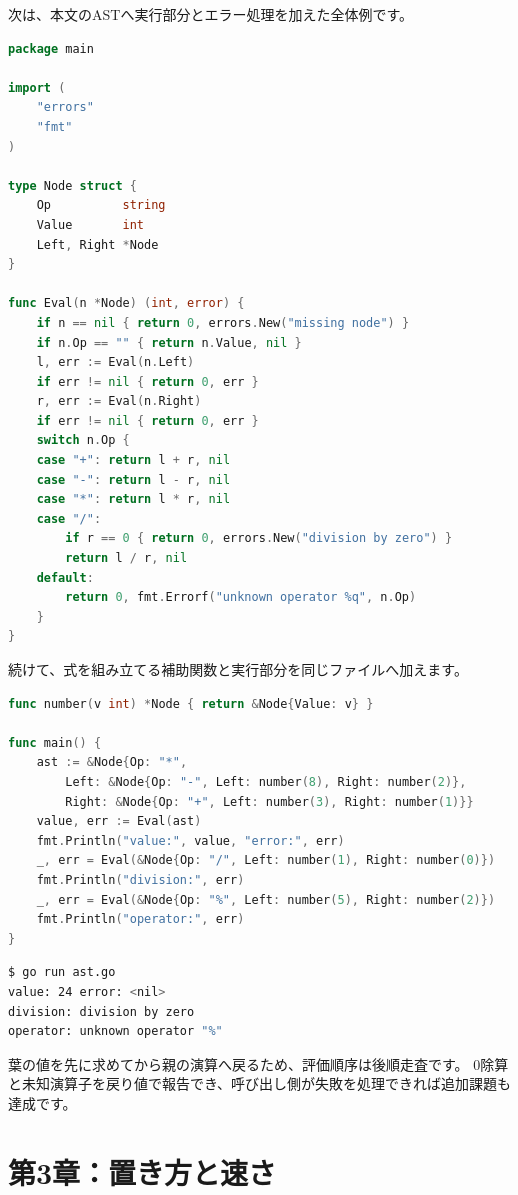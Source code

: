 次は、本文のASTへ実行部分とエラー処理を加えた全体例です。

\begin{lstlisting}[language=Go]
package main

import (
    "errors"
    "fmt"
)

type Node struct {
    Op          string
    Value       int
    Left, Right *Node
}

func Eval(n *Node) (int, error) {
    if n == nil { return 0, errors.New("missing node") }
    if n.Op == "" { return n.Value, nil }
    l, err := Eval(n.Left)
    if err != nil { return 0, err }
    r, err := Eval(n.Right)
    if err != nil { return 0, err }
    switch n.Op {
    case "+": return l + r, nil
    case "-": return l - r, nil
    case "*": return l * r, nil
    case "/":
        if r == 0 { return 0, errors.New("division by zero") }
        return l / r, nil
    default:
        return 0, fmt.Errorf("unknown operator %q", n.Op)
    }
}
\end{lstlisting}

続けて、式を組み立てる補助関数と実行部分を同じファイルへ加えます。

\begin{lstlisting}[language=Go]
func number(v int) *Node { return &Node{Value: v} }

func main() {
    ast := &Node{Op: "*",
        Left: &Node{Op: "-", Left: number(8), Right: number(2)},
        Right: &Node{Op: "+", Left: number(3), Right: number(1)}}
    value, err := Eval(ast)
    fmt.Println("value:", value, "error:", err)
    _, err = Eval(&Node{Op: "/", Left: number(1), Right: number(0)})
    fmt.Println("division:", err)
    _, err = Eval(&Node{Op: "%", Left: number(5), Right: number(2)})
    fmt.Println("operator:", err)
}
\end{lstlisting}

\begin{lstlisting}[language=bash]
$ go run ast.go
value: 24 error: <nil>
division: division by zero
operator: unknown operator "%"
\end{lstlisting}

葉の値を先に求めてから親の演算へ戻るため、評価順序は後順走査です。
0除算と未知演算子を戻り値で報告でき、呼び出し側が失敗を処理できれば追加課題も達成です。

\section{第3章：置き方と速さ}

